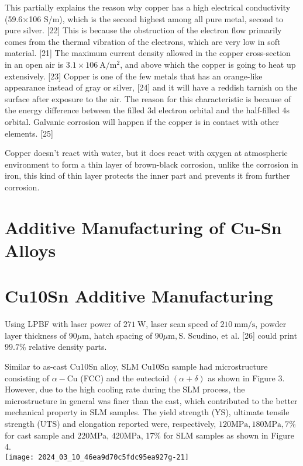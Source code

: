 \documentclass[10pt]{article}
\begin{document}
This partially explains the reason why copper has a high electrical conductivity (59.6×106 S/m), which is the second highest among all pure metal, second to pure silver. [22] This is because the obstruction of the electron flow primarily comes from the thermal vibration of the electrons, which are very low in soft material. [21] The maximum current density allowed in the copper cross-section in an open air is $3.1 \times 106 \mathrm{~A} / \mathrm{m}^{2}$, and above which the copper is going to heat up extensively. [23] Copper is one of the few metals that has an orange-like appearance instead of gray or silver, [24] and it will have a reddish tarnish on the surface after exposure to the air. The reason for this characteristic is because of the energy difference between the filled 3d electron orbital and the half-filled 4s orbital. Galvanic corrosion will happen if the copper is in contact with other elements. [25]

Copper doesn't react with water, but it does react with oxygen at atmospheric environment to form a thin layer of brown-black corrosion, unlike the corrosion in iron, this kind of thin layer protects the inner part and prevents it from further corrosion.

\section*{Additive Manufacturing of Cu-Sn Alloys}
\section*{Cu10Sn Additive Manufacturing}
Using LPBF with laser power of $271 \mathrm{~W}$, laser scan speed of $210 \mathrm{~mm} / \mathrm{s}$, powder layer thickness of $90 \mu \mathrm{m}$, hatch spacing of $90 \mu \mathrm{m}, \mathrm{S}$. Scudino, et al. [26] could print $99.7 \%$ relative density parts.

Similar to as-cast Cu10Sn alloy, SLM Cu10Sn sample had microstructure consisting of $\alpha-\mathrm{Cu}$ (FCC) and the eutectoid $(\alpha+\delta)$ as shown in Figure 3. However, due to the high cooling rate during the SLM process, the microstructure in general was finer than the cast, which contributed to the better mechanical property in SLM samples. The yield strength (YS), ultimate tensile strength (UTS) and elongation reported were, respectively, $120 \mathrm{MPa}, 180 \mathrm{MPa}, 7 \%$ for cast sample and 220MPa, 420MPa, 17\% for SLM samples as shown in Figure 4.\\
\texttt{[image: 2024\_03\_10\_46ea9d70c5fdc95ea927g-21]}
\end{document}

